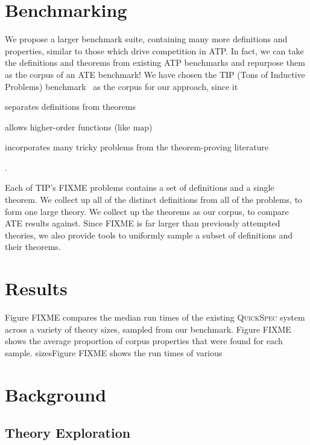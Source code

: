 \documentclass[]{default}
\newcommand{\name}[1]{\mathrm{#1}}
\begin{document}
\section{Benchmarking}

We propose a larger benchmark suite, containing many more definitions and
properties, similar to those which drive competition in ATP. In fact, we can
take the definitions and theorems from existing ATP benchmarks and repurpose
them as the corpus of an ATE benchmark! We have chosen the TIP (Tons of
Inductive Problems) benchmark~\cite{TIP} as the corpus for our approach, since
it \begin{inlinelist}
\item separates definitions from theorems
\item allows higher-order functions (like $\name{map}$)
\item incorporates many tricky problems from the theorem-proving literature
\end{inlinelist}.

Each of TIP's FIXME problems contains a set of definitions and a single theorem.
We collect up all of the distinct definitions from all of the problems, to form
one large theory. We collect up the theorems as our corpus, to compare ATE
results against. Since FIXME is far larger than previously attempted theories,
we also provide tools to uniformly sample a subset of definitions and their
theorems.

\section{Results}

Figure FIXME compares the median run times of the existing
\textsc{QuickSpec}\cite{QuickSpec} system across a variety of theory sizes,
sampled from our benchmark. Figure FIXME shows the average proportion of corpus
properties that were found for each sample. sizesFigure FIXME shows the run times of various
\section{Background}\label{background}

\subsection{Theory Exploration}\label{theory-exploration}
\end{document}
